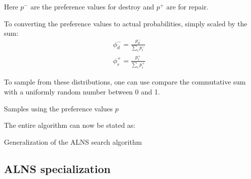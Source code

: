 Here $p^-$ are the preference values for destroy and $p^+$ are for repair.

To converting the preference values to actual probabilities, simply scaled by the sum:
\begin{align}
\phi_d^- = \frac{p_d^-}{\sum_{i} p_i^-} \\
\phi_r^+ = \frac{p_r^+}{\sum_{i} p_i^+}
\end{align}

To sample from these distributions, one can use compare the commutative sum with a uniformly random number between 0 and 1.

\begin{algorithm}[H]
  \caption{Samples using the preference values $p$}
  \begin{algorithmic}[1]
      \State {} 
    \EndFunction
  \end{algorithmic}
\end{algorithm}

The entire algorithm can now be stated as:

\begin{algorithm}[H]
  \caption{Generalization of the ALNS search algorithm}
  \begin{algorithmic}[1]
       
       
      \State
      \Repeat
      \State
      \State
      \EndIf
      \State {}
    \EndFunction
  \end{algorithmic}
\end{algorithm}

\subsection{ALNS specialization}

